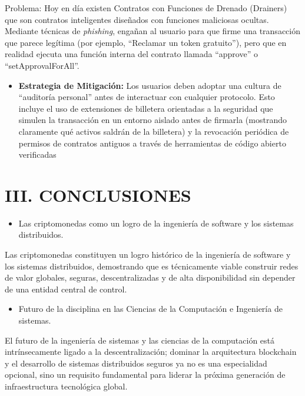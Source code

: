 \documentclass[12pt,a4paper]{article}
\begin{document}
Problema: Hoy en día existen Contratos con Funciones de Drenado (Drainers) que son contratos inteligentes diseñados con funciones maliciosas ocultas. Mediante técnicas de \textit{phishing}, engañan al usuario para que firme una transacción que parece legítima (por ejemplo, ``Reclamar un token gratuito''), pero que en realidad ejecuta una función interna del contrato llamada ``approve'' o ``setApprovalForAll''.

\begin{itemize}
  \item \textbf{Estrategia de Mitigación:} Los usuarios deben adoptar una cultura de ``auditoría personal'' antes de interactuar con cualquier protocolo. Esto incluye el uso de extensiones de billetera orientadas a la seguridad que simulen la transacción en un entorno aislado antes de firmarla (mostrando claramente qué activos saldrán de la billetera) y la revocación periódica de permisos de contratos antiguos a través de herramientas de código abierto verificadas
\end{itemize}

\section{III. CONCLUSIONES}

\begin{itemize}[leftmargin=1.5em]
  \item Las criptomonedas como un logro de la ingeniería de software y los sistemas distribuidos.
\end{itemize}

Las criptomonedas constituyen un logro histórico de la ingeniería de software y los sistemas distribuidos, demostrando que es técnicamente viable construir redes de valor globales, seguras, descentralizadas y de alta disponibilidad sin depender de una entidad central de control.

\begin{itemize}[leftmargin=1.5em]
  \item Futuro de la disciplina en las Ciencias de la Computación e Ingeniería de sistemas.
\end{itemize}

El futuro de la ingeniería de sistemas y las ciencias de la computación está intrínsecamente ligado a la descentralización; dominar la arquitectura blockchain y el desarrollo de sistemas distribuidos seguros ya no es una especialidad opcional, sino un requisito fundamental para liderar la próxima generación de infraestructura tecnológica global.
\end{document}
